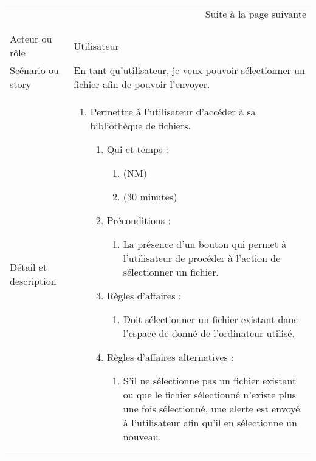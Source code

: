 \begin{longtable}{|l|p{}|}
\multicolumn{2}{r}{Suite à la page suivante} \\
\endfoot

\multicolumn{2}{r}{} \\
\endlastfoot

\hline
    \rowcolor{Gray}
    \multicolumn{2}{|l|}{1} \\
\hline
    Acteur ou rôle & Utilisateur \\
\hline
    Scénario ou story & En tant qu'utilisateur, 
      je veux pouvoir sélectionner un fichier
      afin de pouvoir l'envoyer. \\
\hline
    Détail et description &
        \begin{enumerate}[label*=\arabic*.]
            \item Permettre à l’utilisateur d’accéder à sa bibliothèque de fichiers.
            \begin{enumerate}[label*=\arabic*.]
                    \item Qui et temps :
                    \begin{enumerate}[label*=\arabic*.]
                        \item (NM)
                        \item (30 minutes)
                    \end{enumerate}
                    \item Préconditions : 
                    \begin{enumerate}[label*=\arabic*.]
                        \item La présence d'un bouton qui permet à l'utilisateur de procéder à l'action de sélectionner un fichier.
                    \end{enumerate}
                    \item Règles d’affaires :
                    \begin{enumerate}[label*=\arabic*.]
                        \item Doit sélectionner un fichier existant dans l'espace de donné de l'ordinateur utilisé.
                    \end{enumerate}
                    \item Règles d’affaires alternatives :
                    \begin{enumerate}[label*=\arabic*.]
                        \item S'il ne sélectionne pas un fichier existant ou que le fichier sélectionné n'existe plus une fois sélectionné, une alerte est envoyé à l'utilisateur afin qu'il en sélectionne un nouveau.

\end{enumerate}
\end{enumerate}
\end{enumerate}
\end{longtable}
